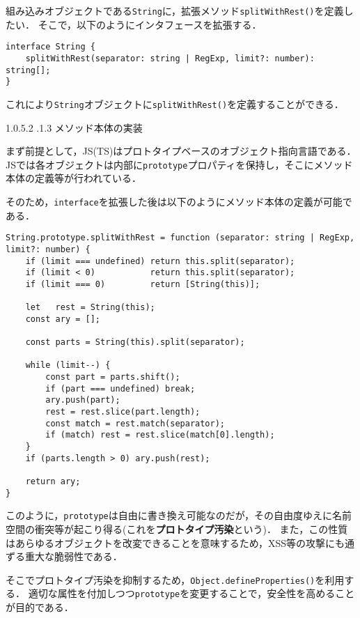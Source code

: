 \documentclass[autodetect-engine,dvi=dvipdfmx,ja=standard,
               a4j,11pt]{bxjsarticle}
\makeatletter
\renewcommand{\paragraph}{\@startsection{paragraph}{4}{\z@}%
  {1.0\Cvs \@plus.5\Cdp \@minus.2\Cdp}%
  {.1\Cvs \@plus.3\Cdp}%
  {\reset@font\sffamily\normalsize}
}
\makeatother
\begin{document}
組み込みオブジェクトである\verb|String|に，拡張メソッド\verb|splitWithRest()|を定義したい．
そこで，以下のようにインタフェースを拡張する．

\begin{Verbatim}[numbers=none, xleftmargin=8mm, numbersep=6pt, fontsize=\small, baselinestretch=0.8]
interface String {
    splitWithRest(separator: string | RegExp, limit?: number): string[];
}
\end{Verbatim}
%
これにより\verb|String|オブジェクトに\verb|splitWithRest()|を定義することができる．

\paragraph{メソッド本体の実装}

まず前提として，JS(TS)はプロトタイプベースのオブジェクト指向言語である．
JSでは各オブジェクトは内部に\verb|prototype|プロパティを保持し，そこにメソッド本体の定義等が行われている．

そのため，\verb|interface|を拡張した後は以下のようにメソッド本体の定義が可能である．

\begin{Verbatim}[numbers=none, xleftmargin=8mm, numbersep=6pt, fontsize=\small, baselinestretch=0.8]
String.prototype.splitWithRest = function (separator: string | RegExp, limit?: number) {
    if (limit === undefined) return this.split(separator);
    if (limit < 0)           return this.split(separator);
    if (limit === 0)         return [String(this)];

    let   rest = String(this);
    const ary = [];

    const parts = String(this).split(separator);

    while (limit--) {
        const part = parts.shift();
        if (part === undefined) break;
        ary.push(part);
        rest = rest.slice(part.length);
        const match = rest.match(separator);
        if (match) rest = rest.slice(match[0].length);
    }
    if (parts.length > 0) ary.push(rest);

    return ary;
}
\end{Verbatim}
%
このように，\verb|prototype|は自由に書き換え可能なのだが，その自由度ゆえに名前空間の衝突等が起こり得る(これを{\bf プロトタイプ汚染}という)．
また，この性質はあらゆるオブジェクトを改変できることを意味するため，XSS等の攻撃にも通ずる重大な脆弱性である．

そこでプロトタイプ汚染を抑制するため，\verb|Object.defineProperties()|を利用する．
適切な属性を付加しつつ\verb|prototype|を変更することで，安全性を高めることが目的である．
\end{document}
